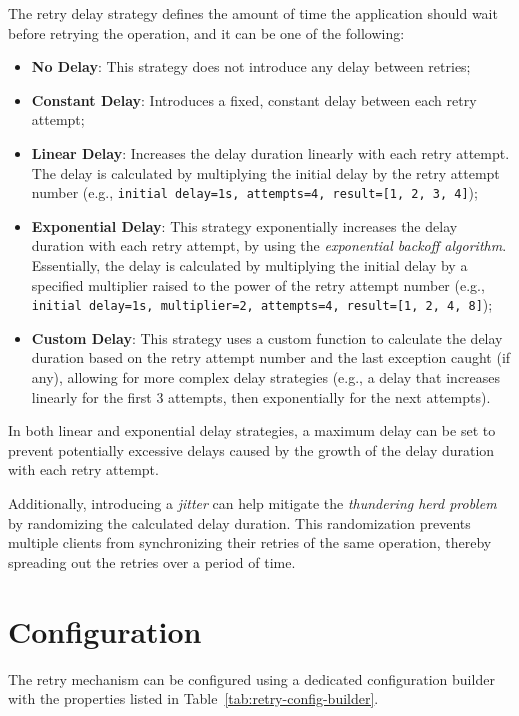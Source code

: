 The retry delay strategy defines the amount of time the application should wait before retrying the operation, and it can be one of the following:

\begin{itemize}
    \item \textbf{No Delay}: This strategy does not introduce any delay between retries;
    \item \textbf{Constant Delay}: Introduces a fixed, constant delay between each retry attempt;
    \item \textbf{Linear Delay}: Increases the delay duration linearly with each retry attempt.
    The delay is calculated by multiplying the initial delay by the retry attempt number
    (e.g., \texttt{initial delay=1s, attempts=4, result=[1, 2, 3, 4]});
    \item \textbf{Exponential Delay}: This strategy exponentially increases the delay duration with each retry attempt, by using the \textit{exponential backoff algorithm}.
    Essentially, the delay is calculated by multiplying the initial delay by a specified multiplier raised to the power of the retry attempt number (e.g., \texttt{initial delay=1s, multiplier=2, attempts=4, result=[1, 2, 4, 8]});
    \item \textbf{Custom Delay}: This strategy uses a custom function to calculate the delay duration based on the retry attempt number and the last exception caught (if any), allowing for more complex delay strategies (e.g., a delay that increases linearly for the first 3 attempts, then exponentially for the next attempts).
\end{itemize}

In both linear and exponential delay strategies, a maximum delay can be set to prevent potentially excessive delays caused by the growth of the delay duration with each retry attempt.

Additionally, introducing a \textit{jitter} can help mitigate the \textit{thundering herd problem} by randomizing the calculated delay duration.
This randomization prevents multiple clients from synchronizing their retries of the same operation,
thereby spreading out the retries over a period of time.


\section{Configuration}\label{sec:retry-configuration}

The retry mechanism can be configured using a dedicated configuration builder with the properties listed in Table~\ref{tab:retry-config-builder}.

